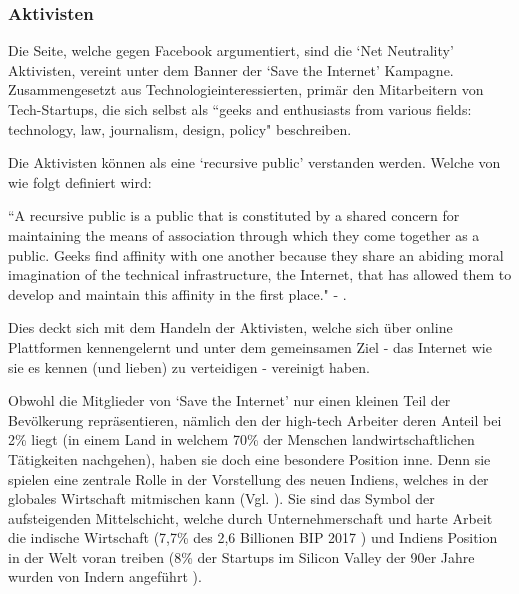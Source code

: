 \documentclass{article}
\begin{document}
\subsubsection{Aktivisten}

Die Seite, welche gegen Facebook argumentiert, sind die `Net Neutrality' Aktivisten, vereint unter dem Banner der `Save the Internet' Kampagne.
Zusammengesetzt aus Technologieinteressierten, primär den Mitarbeitern von Tech-Startups, die sich selbst als ``geeks and enthusiasts from various fields: technology, law, journalism, design, policy" \parencite{sti2015} beschreiben.

\medskip

Die Aktivisten können als eine `recursive public' verstanden werden. Welche von \textcite{twoBits} wie folgt definiert wird:

\medskip

``A recursive public is a public that is constituted by a shared concern for maintaining the means of association through which they come together as a public.
Geeks find affinity with one another because they share an abiding moral imagination of the technical infrastructure, the Internet, that has allowed them to develop and maintain this affinity in the first place." - \cite[28]{twoBits}.

\medskip

Dies deckt sich mit dem Handeln der Aktivisten, welche sich über online Plattformen kennengelernt und unter dem gemeinsamen Ziel - das Internet wie sie es kennen (und lieben) zu verteidigen - vereinigt haben.

\medskip

Obwohl die Mitglieder von `Save the Internet' nur einen kleinen Teil der Bevölkerung repräsentieren, nämlich den der high-tech Arbeiter deren Anteil bei 2\% liegt (in einem Land in welchem 70\% der Menschen landwirtschaftlichen Tätigkeiten nachgehen), haben sie doch eine besondere Position inne. Denn sie spielen eine zentrale Rolle in der Vorstellung des neuen Indiens, welches in der globales Wirtschaft mitmischen kann (Vgl. \cite{thomas2012}).
Sie sind das Symbol der aufsteigenden Mittelschicht, welche durch Unternehmerschaft und harte Arbeit die indische Wirtschaft (7,7\% des 2,6 Billionen BIP 2017 \autocite{statistaIndiaGDP}\autocite{imfIndiaGDP}) und Indiens Position in der Welt voran treiben (8\% der Startups im Silicon Valley der 90er Jahre wurden von Indern angeführt \parencite{upadhya2004}).

\medskip
\end{document}
